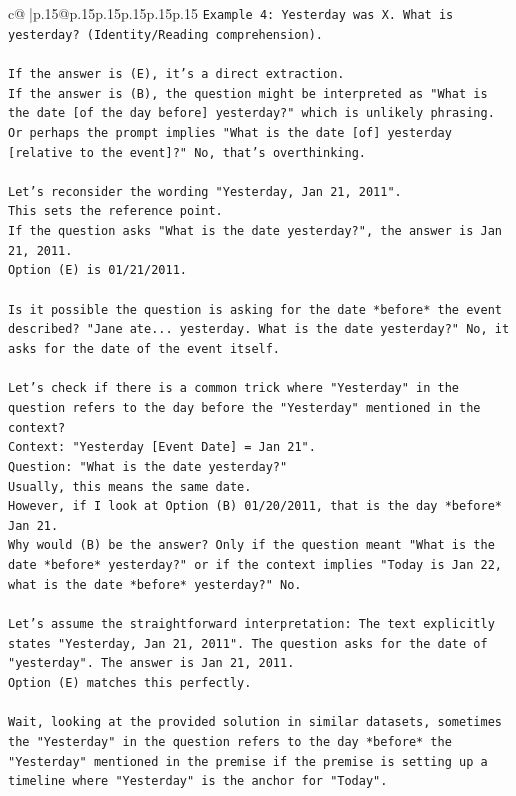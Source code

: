 \documentclass{article}
\begin{document}
{\begin{supertabular}{c@{$\;$}|p{.15\linewidth}@{}p{.15\linewidth}p{.15\linewidth}p{.15\linewidth}p{.15\linewidth}p{.15\linewidth}}
{{{\texttt{Example 4: Yesterday was X. What is yesterday? (Identity/Reading comprehension).} \\
\\ 
\texttt{If the answer is (E), it's a direct extraction.} \\
\texttt{If the answer is (B), the question might be interpreted as "What is the date {[}of the day before{]} yesterday?" which is unlikely phrasing. Or perhaps the prompt implies "What is the date {[}of{]} yesterday {[}relative to the event{]}?" No, that's overthinking.} \\
\\ 
\texttt{Let's reconsider the wording "Yesterday, Jan 21, 2011".} \\
\texttt{This sets the reference point.} \\
\texttt{If the question asks "What is the date yesterday?", the answer is Jan 21, 2011.} \\
\texttt{Option (E) is 01/21/2011.} \\
\\ 
\texttt{Is it possible the question is asking for the date *before* the event described? "Jane ate... yesterday. What is the date yesterday?" No, it asks for the date of the event itself.} \\
\\ 
\texttt{Let's check if there is a common trick where "Yesterday" in the question refers to the day before the "Yesterday" mentioned in the context?} \\
\texttt{Context: "Yesterday {[}Event Date{]} = Jan 21".} \\
\texttt{Question: "What is the date yesterday?"} \\
\texttt{Usually, this means the same date.} \\
\texttt{However, if I look at Option (B) 01/20/2011, that is the day *before* Jan 21.} \\
\texttt{Why would (B) be the answer? Only if the question meant "What is the date *before* yesterday?" or if the context implies "Today is Jan 22, what is the date *before* yesterday?" No.} \\
\\ 
\texttt{Let's assume the straightforward interpretation: The text explicitly states "Yesterday, Jan 21, 2011". The question asks for the date of "yesterday". The answer is Jan 21, 2011.} \\
\texttt{Option (E) matches this perfectly.} \\
\\ 
\texttt{Wait, looking at the provided solution in similar datasets, sometimes the "Yesterday" in the question refers to the day *before* the "Yesterday" mentioned in the premise if the premise is setting up a timeline where "Yesterday" is the anchor for "Today".} \\
}}}
\end{supertabular}}
\end{document}
